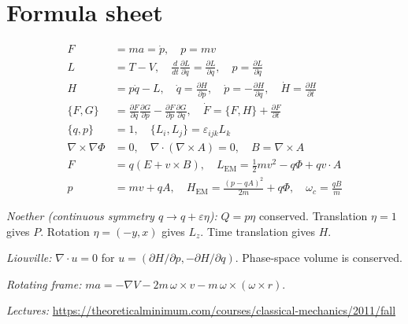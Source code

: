 \documentclass[11pt]{article}
\numberwithin{equation}{section}
\newcommand{\qdot}{\dot{q}}
\newcommand{\pdot}{\dot{p}}
\newcommand{\ddt}{\frac{d}{dt}}
\newcommand{\pd}[2]{\frac{\partial #1}{\partial #2}}
\begin{document}
\section*{Formula sheet}

\begin{align*}
F&=ma=\dot p,\quad p=mv \\[0.3em]
L&=T-V,\quad
\ddt\pd{L}{\qdot}=\pd{L}{q},\quad
p=\pd{L}{\qdot} \\[0.3em]
H&=p\qdot-L,\quad
\qdot=\pd{H}{p},\quad
\pdot=-\pd{H}{q},\quad
\dot H=\pd{H}{t} \\[0.3em]
\{F,G\}&=\pd{F}{q}\pd{G}{p}-\pd{F}{p}\pd{G}{q},\quad
\dot F=\{F,H\}+\pd{F}{t} \\[0.3em]
\{q,p\}&=1,\quad \{L_i,L_j\}=\varepsilon_{ijk}L_k \\[0.3em]
\nabla\times\nabla\Phi&=0,\quad \nabla\cdot(\nabla\times A)=0,\quad B=\nabla\times A \\[0.3em]
F&=q(E+v\times B),\quad
L_{\mathrm{EM}}=\tfrac12 mv^2-q\Phi+q v\cdot A \\[0.3em]
p&=mv+qA,\quad
H_{\mathrm{EM}}=\frac{(p-qA)^2}{2m}+q\Phi,\quad
\omega_c=\frac{qB}{m}
\end{align*}

\vspace{0.8em}
\noindent\emph{Noether (continuous symmetry $q\to q+\varepsilon\eta$):} $Q=p\eta$ conserved.
Translation $\eta=1$ gives $P$. Rotation $\eta=(-y,x)$ gives $L_z$. Time translation gives $H$.

\vspace{0.4em}
\noindent\emph{Liouville:} $\nabla\cdot u=0$ for $u=(\partial H/\partial p,-\partial H/\partial q)$. Phase-space volume is conserved.

\vspace{0.4em}
\noindent\emph{Rotating frame:} $m a=-\nabla V-2m\,\omega\times v-m\,\omega\times(\omega\times r)$.

\vspace{1em}
\noindent\emph{Lectures:}
\url{https://theoreticalminimum.com/courses/classical-mechanics/2011/fall}
\end{document}
